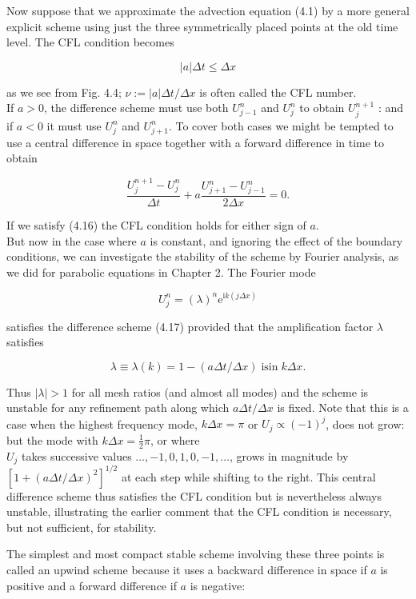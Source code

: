 \documentclass[10pt]{article}
\begin{document}
Now suppose that we approximate the advection equation (4.1) by a more general explicit scheme using just the three symmetrically placed points at the old time level. The CFL condition becomes

\[
|a| \Delta t \leq \Delta x
\]

as we see from Fig. 4.4; \(\nu:=|a| \Delta t / \Delta x\) is often called the CFL number.\\
If \(a>0\), the difference scheme must use both \(U_{j-1}^{n}\) and \(U_{j}^{n}\) to obtain \(U_{j}^{n+1}\) : and if \(a<0\) it must use \(U_{j}^{n}\) and \(U_{j+1}^{n}\). To cover both cases we might be tempted to use a central difference in space together with a forward difference in time to obtain

\[
\frac{U_{j}^{n+1}-U_{j}^{n}}{\Delta t}+a \frac{U_{j+1}^{n}-U_{j-1}^{n}}{2 \Delta x}=0 .
\]

If we satisfy (4.16) the CFL condition holds for either sign of \(a\).\\
But now in the case where \(a\) is constant, and ignoring the effect of the boundary conditions, we can investigate the stability of the scheme by Fourier analysis, as we did for parabolic equations in Chapter 2. The Fourier mode

\[
U_{j}^{n}=(\lambda)^{n} \mathrm{e}^{\mathrm{i} k(j \Delta x)}
\]

satisfies the difference scheme (4.17) provided that the amplification factor \(\lambda\) satisfies

\[
\lambda \equiv \lambda(k)=1-(a \Delta t / \Delta x) \operatorname{isin} k \Delta x .
\]

Thus \(|\lambda|>1\) for all mesh ratios (and almost all modes) and the scheme is unstable for any refinement path along which \(a \Delta t / \Delta x\) is fixed. Note that this is a case when the highest frequency mode, \(k \Delta x=\pi\) or \(U_{j} \propto(-1)^{j}\), does not grow: but the mode with \(k \Delta x=\frac{1}{2} \pi\), or where\\
\(U_{j}\) takes successive values \(\ldots,-1,0,1,0,-1, \ldots\), grows in magnitude by \(\left[1+(a \Delta t / \Delta x)^{2}\right]^{1 / 2}\) at each step while shifting to the right. This central difference scheme thus satisfies the CFL condition but is nevertheless always unstable, illustrating the earlier comment that the CFL condition is necessary, but not sufficient, for stability.

The simplest and most compact stable scheme involving these three points is called an upwind scheme because it uses a backward difference in space if \(a\) is positive and a forward difference if \(a\) is negative:
\end{document}

